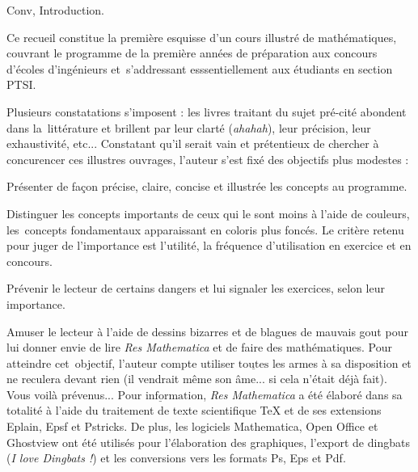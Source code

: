 \vfill\null
\eject

                                                    \ifHtml   \fi
                          

\iffalse\Chapter Conv, Introduction.

Ce recueil constitue la premi\`ere esquisse d'un cours illustr\'e de math\'ematiques, 
couvrant le programme de la premi\`ere ann\'ees de pr\'eparation aux concours d'\'ecoles d'ing\'enieurs 
et~s'addressant esssentiellement aux \'etudiants en section PTSI. 
\bigskip

Plusieurs constatations s'imposent : les livres traitant du sujet pr\'e-cit\'e abondent dans la~litt\'erature 
et brillent par leur clart\'e ({\it ahahah}), leur pr\'ecision, leur exhaustivit\'e, etc...
Constatant qu'il serait vain et pr\'etentieux de chercher \`a concurencer ces illustres ouvrages, 
l'auteur s'est fix\'e des objectifs plus modestes : 
\medskip

\Bullet Pr\'esenter de fa\c con pr\'ecise, claire, concise et illustr\'ee les concepts au programme. 
\medskip

\Bullet Distinguer les concepts importants de ceux qui le sont moins \`a l'aide de couleurs, 
les~concepts fondamentaux apparaissant en coloris plus fonc\'es. 
Le crit\`ere retenu pour juger de l'importance est l'utilit\'e, la fr\'equence d'utilisation en exercice et en concours. 
\bigskip
{}
\bigskip

\Bullet Pr\'evenir le lecteur de certains dangers et lui signaler les exercices, selon leur importance. 

\bigskip
{}
\bigskip

\Bullet Amuser le lecteur \`a l'aide de dessins bizarres et de blagues de mauvais gout pour lui donner envie de lire {\it Res Mathematica} 
et de faire des math\'ematiques. Pour atteindre cet~objectif, l'auteur compte utiliser $\underline{\mbox{toutes}}$ les armes \`a sa disposition et ne reculera devant rien (il vendrait m\^eme son \^ame... si cela n'\'etait d\'ej\`a fait). 
Vous voil\`a pr\'evenus... 
\bigskip
\vfill
\noindent $\underline{\mbox{Pour information}}$, {\it Res Mathematica} a \'et\'e \'elabor\'e dans sa totalit\'e \`a l'aide du traitement de texte scientifique \TeX{} et de ses 
extensions Eplain, Epsf et Pstricks. De plus, les logiciels Mathematica, Open Office et Ghostview ont \'et\'e utilis\'es pour
l'\'elaboration des graphiques, l'export de dingbats ({\it I love Dingbats !}) et les conversions vers les formats Ps, Eps et Pdf. 

